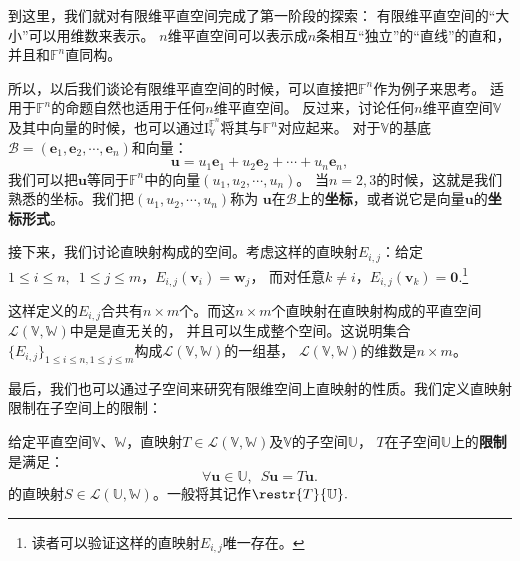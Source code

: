 \documentclass[12pt,UTF8]{ctexbook}
\begin{document}
到这里，我们就对有限维平直空间完成了第一阶段的探索：
有限维平直空间的“大小”可以用维数来表示。
$n$维平直空间可以表示成$n$条相互“独立”的“直线”的直和，并且和$\mathbb{F}^n$直同构。

所以，以后我们谈论有限维平直空间的时候，可以直接把$\mathbb{F}^n$作为例子来思考。
适用于$\mathbb{F}^n$的命题自然也适用于任何$n$维平直空间。
反过来，讨论任何$n$维平直空间$\mathbb{V}$及其中向量的时候，也可以通过$\mathrm{I}_{\mathbb{V}}^{\mathbb{F}^n}$将其与$\mathbb{F}^n$对应起来。
对于$\mathbb{V}$的基底$\mathcal{B} = (\mathbf{e}_1, \mathbf{e}_2, \cdots , \mathbf{e}_n)$和向量：
$$\mathbf{u} = u_1\mathbf{e}_1+u_2\mathbf{e}_2+\cdots+u_n\mathbf{e}_n,$$
我们可以把$\mathbf{u}$等同于$\mathbb{F}^n$中的向量$(u_1, u_2, \cdots , u_n)$。
当$n=2,3$的时候，这就是我们熟悉的坐标。我们把$(u_1, u_2, \cdots , u_n)$称为
$\mathbf{u}$在$\mathcal{B}$上的\textbf{坐标}，或者说它是向量$\mathbf{u}$的\textbf{坐标形式}。

接下来，我们讨论直映射构成的空间。考虑这样的直映射$E_{i,j}$：给定$1 \leq i \leq n, \,\, \, 1 \leq j \leq m$，$ E_{i,j} (\mathbf{v}_i)= \mathbf{w}_j$，
而对任意$k \neq i$，$E_{i,j}(\mathbf{v}_k) = \mathbf{0}.$\footnote{读者可以验证这样的直映射$E_{i,j}$唯一存在。}

这样定义的$E_{i,j}$合共有$n\times m$个。而这$n\times m$个直映射在直映射构成的平直空间$\mathcal{L}(\mathbb{V},\mathbb{W})$中是是直无关的，
并且可以生成整个空间。这说明集合$\{E_{i,j}\}_{1 \leq i \leq n,  1 \leq j \leq m}$构成$\mathcal{L}(\mathbb{V},\mathbb{W})$的一组基，
$\mathcal{L}(\mathbb{V},\mathbb{W})$的维数是$n\times m$。

最后，我们也可以通过子空间来研究有限维空间上直映射的性质。我们定义直映射限制在子空间上的限制：
\begin{df}\label{df:3_4}
    给定平直空间$\mathbb{V}$、$\mathbb{W}$，直映射$T \in \mathcal{L}(\mathbb{V},\mathbb{W})$及$\mathbb{V}$的子空间$\mathbb{U}$，
    $T$在子空间$\mathbb{U}$上的\textbf{限制}是满足：
    $$ \forall \mathbf{u} \in \mathbb{U}, \,\,\, S\mathbf{u} = T\mathbf{u}. $$
    的直映射$S \in \mathcal{L}(\mathbb{U},\mathbb{W})$。一般将其记作$\restr{T}{\mathbb{U}}.$
\end{df}
\end{document}
